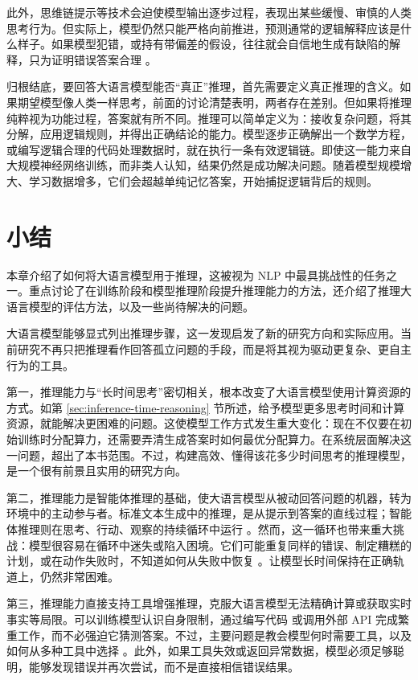 此外，思维链提示等技术会迫使模型输出逐步过程，表现出某些缓慢、审慎的人类思考行为。但实际上，模型仍然只能严格向前推进，预测通常的逻辑解释应该是什么样子。如果模型犯错，或持有带偏差的假设，往往就会自信地生成有缺陷的解释，只为证明错误答案合理 \cite{chen-etal:2025reasoning}。

归根结底，要回答大语言模型能否“真正”推理，首先需要定义真正推理的含义。如果期望模型像人类一样思考，前面的讨论清楚表明，两者存在差别。但如果将推理纯粹视为功能过程，答案就有所不同。推理可以简单定义为：接收复杂问题，将其分解，应用逻辑规则，并得出正确结论的能力。模型逐步正确解出一个数学方程，或编写逻辑合理的代码处理数据时，就在执行一条有效逻辑链。即使这一能力来自大规模神经网络训练，而非类人认知，结果仍然是成功解决问题。随着模型规模增大、学习数据增多，它们会超越单纯记忆答案，开始捕捉逻辑背后的规则。


\section{小结}

本章介绍了如何将大语言模型用于推理，这被视为 NLP 中最具挑战性的任务之一。重点讨论了在训练阶段和模型推理阶段提升推理能力的方法，还介绍了推理大语言模型的评估方法，以及一些尚待解决的问题。

大语言模型能够显式列出推理步骤，这一发现启发了新的研究方向和实际应用。当前研究不再只把推理看作回答孤立问题的手段，而是将其视为驱动更复杂、更自主行为的工具。

第一，推理能力与“长时间思考”密切相关，根本改变了大语言模型使用计算资源的方式。如第 \ref{sec:inference-time-reasoning} 节所述，给予模型更多思考时间和计算资源，就能解决更困难的问题。这使模型工作方式发生重大变化：现在不仅要在初始训练时分配算力，还需要弄清生成答案时如何最优分配算力。在系统层面解决这一问题，超出了本书范围。不过，构建高效、懂得该花多少时间思考的推理模型，是一个很有前景且实用的研究方向。

第二，推理能力是智能体推理的基础，使大语言模型从被动回答问题的机器，转为环境中的主动参与者。标准文本生成中的推理，是从提示到答案的直线过程；智能体推理则在思考、行动、观察的持续循环中运行 \cite{yao-etal:2023react}。然而，这一循环也带来重大挑战：模型很容易在循环中迷失或陷入困境。它们可能重复同样的错误、制定糟糕的计划，或在动作失败时，不知道如何从失败中恢复 \cite{shinn-etal:2023reflexion}。让模型长时间保持在正确轨道上，仍然非常困难。

第三，推理能力直接支持工具增强推理，克服大语言模型无法精确计算或获取实时事实等局限。可以训练模型认识自身限制，通过编写代码 \cite{gao-etal:2023pal} 或调用外部 API \cite{schick-etal:2024toolformer} 完成繁重工作，而不必强迫它猜测答案。不过，主要问题是教会模型何时需要工具，以及如何从多种工具中选择 \cite{qin-etal:2024toolllm}。此外，如果工具失效或返回异常数据，模型必须足够聪明，能够发现错误并再次尝试，而不是直接相信错误结果。

